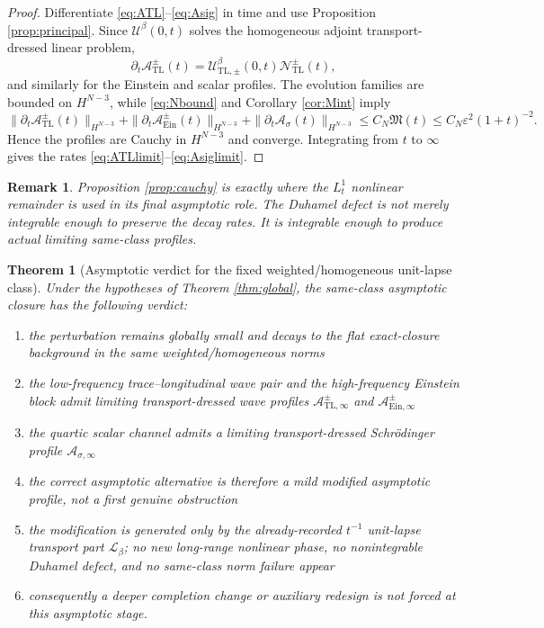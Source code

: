 \documentclass[11pt]{article}
\newcommand{\Ell}{\mathcal{L}}
\newtheorem{remark}{Remark}
\newtheorem{theorem}{Theorem}
\begin{document}
\begin{proof}
Differentiate \eqref{eq:ATL}--\eqref{eq:Asig} in time and use Proposition \ref{prop:principal}. Since \(\mathcal U^\beta(0,t)\) solves the homogeneous adjoint transport-dressed linear problem,
\[
\partial_t\mathcal A_{\mathrm{TL}}^\pm(t)
=
\mathcal U_{\mathrm{TL},\pm}^\beta(0,t)\mathcal N_{\mathrm{TL}}^\pm(t),
\]
and similarly for the Einstein and scalar profiles. The evolution families are bounded on \(H^{N-3}\), while \eqref{eq:Nbound} and Corollary \ref{cor:Mint} imply
\[
\|\partial_t\mathcal A_{\mathrm{TL}}^\pm(t)\|_{H^{N-3}}
+ \|\partial_t\mathcal A_{\mathrm{Ein}}^\pm(t)\|_{H^{N-3}}
+ \|\partial_t\mathcal A_\sigma(t)\|_{H^{N-3}}
\le
C_N\mathfrak M(t)
\le
C_N\varepsilon^2(1+t)^{-2}.
\]
Hence the profiles are Cauchy in \(H^{N-3}\) and converge. Integrating from \(t\) to \(\infty\) gives the rates \eqref{eq:ATLlimit}--\eqref{eq:Asiglimit}.
\end{proof}

\begin{remark}
Proposition \ref{prop:cauchy} is exactly where the \(L_t^1\) nonlinear remainder is used in its final asymptotic role. The Duhamel defect is not merely integrable enough to preserve the decay rates. It is integrable enough to produce actual limiting same-class profiles.
\end{remark}

\begin{theorem}[Asymptotic verdict for the fixed weighted/homogeneous unit-lapse class]
\label{thm:verdict}
Under the hypotheses of Theorem \ref{thm:global}, the same-class asymptotic closure has the following verdict:
\begin{enumerate}
    \item the perturbation remains globally small and decays to the flat exact-closure background in the same weighted/homogeneous norms
    \item the low-frequency trace--longitudinal wave pair and the high-frequency Einstein block admit limiting transport-dressed wave profiles \(\mathcal A_{\mathrm{TL},\infty}^\pm\) and \(\mathcal A_{\mathrm{Ein},\infty}^\pm\)
    \item the quartic scalar channel admits a limiting transport-dressed Schr\"odinger profile \(\mathcal A_{\sigma,\infty}\)
    \item the correct asymptotic alternative is therefore \emph{a mild modified asymptotic profile}, not a first genuine obstruction
    \item the modification is generated only by the already-recorded \(t^{-1}\) unit-lapse transport part \(\Ell_\beta\); no new long-range nonlinear phase, no nonintegrable Duhamel defect, and no same-class norm failure appear
    \item consequently a deeper completion change or auxiliary redesign is \emph{not} forced at this asymptotic stage.
\end{enumerate}
\end{theorem}
\end{document}
